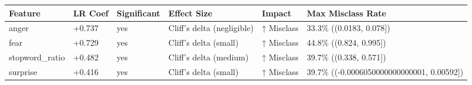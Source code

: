 \begin{tabular}{llllll}
\toprule
Feature & LR Coef & Significant & Effect Size & Impact & Max Misclass Rate \\
\midrule
anger & +0.737 & yes & Cliff's delta (negligible) & ↑ Misclass & 33.3\% ((0.0183, 0.078]) \\
fear & +0.729 & yes & Cliff's delta (small) & ↑ Misclass & 44.8\% ((0.824, 0.995]) \\
stopword\_ratio & +0.482 & yes & Cliff's delta (medium) & ↑ Misclass & 39.7\% ((0.338, 0.571]) \\
surprise & +0.416 & yes & Cliff's delta (small) & ↑ Misclass & 39.7\% ((-0.0006050000000000001, 0.00592]) \\
\bottomrule
\end{tabular}

